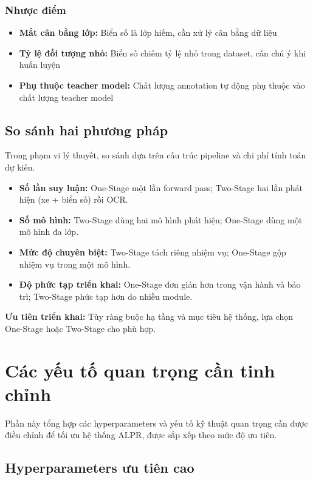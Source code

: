 \subsubsection{Nhược điểm}
\begin{itemize}
    \item \textbf{Mất cân bằng lớp:} Biển số là lớp hiếm, cần xử lý cân bằng dữ liệu
    \item \textbf{Tỷ lệ đối tượng nhỏ:} Biển số chiếm tỷ lệ nhỏ trong dataset, cần chú ý khi huấn luyện
    \item \textbf{Phụ thuộc teacher model:} Chất lượng annotation tự động phụ thuộc vào chất lượng teacher model
\end{itemize}

\subsection{So sánh hai phương pháp}

Trong phạm vi lý thuyết, so sánh dựa trên cấu trúc pipeline và chi phí tính toán dự kiến.
\begin{itemize}
    \item \textbf{Số lần suy luận:} One-Stage một lần forward pass; Two-Stage hai lần phát hiện (xe + biển số) rồi OCR.
    \item \textbf{Số mô hình:} Two-Stage dùng hai mô hình phát hiện; One-Stage dùng một mô hình đa lớp.
    \item \textbf{Mức độ chuyên biệt:} Two-Stage tách riêng nhiệm vụ; One-Stage gộp nhiệm vụ trong một mô hình.
    \item \textbf{Độ phức tạp triển khai:} One-Stage đơn giản hơn trong vận hành và bảo trì; Two-Stage phức tạp hơn do nhiều module.
\end{itemize}

\textbf{Ưu tiên triển khai:} Tùy ràng buộc hạ tầng và mục tiêu hệ thống, lựa chọn One-Stage hoặc Two-Stage cho phù hợp.
\section{Các yếu tố quan trọng cần tinh chỉnh}

Phần này tổng hợp các hyperparameters và yếu tố kỹ thuật quan trọng cần được điều chỉnh để tối ưu hệ thống ALPR, được sắp xếp theo mức độ ưu tiên.

\subsection{Hyperparameters ưu tiên cao}

